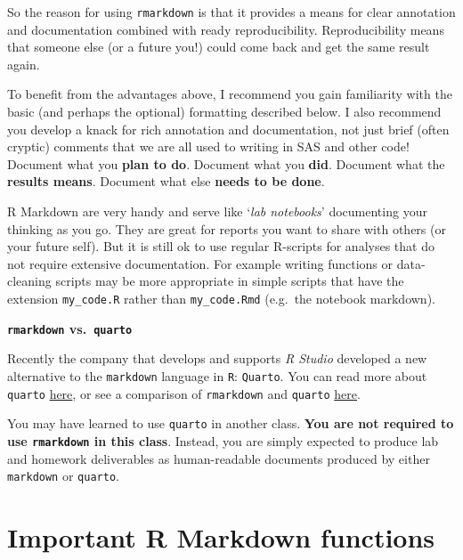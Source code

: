 \documentclass[
]{book}
\newenvironment{rmdtip}[1]
  {
  \begin{itemize}
  \renewcommand{\labelitemi}{
    \raisebox{-.7\height}[0pt][0pt]{
      {\setkeys{Gin}{width=3em,keepaspectratio}\texttt{[image: images/\#1]}}
    }
  }
  \setlength{\fboxsep}{1em}
  \begin{tip}
  \item
  }
  {
  \end{tip}
  \end{itemize}
  }
\begin{document}
So the reason for using \texttt{rmarkdown} is that it provides a means for clear annotation and documentation combined with ready reproducibility. Reproducibility means that someone else (or a future you!) could come back and get the same result again.

To benefit from the advantages above, I recommend you gain familiarity with the basic (and perhaps the optional) formatting described below. I also recommend you develop a knack for rich annotation and documentation, not just brief (often cryptic) comments that we are all used to writing in SAS and other code! Document what you \textbf{plan to do}. Document what you \textbf{did}. Document what the \textbf{results means}. Document what else \textbf{needs to be done}.

\begin{rmdtip}{tip}
R Markdown are very handy and serve like `\emph{lab notebooks}' documenting your thinking as you go. They are great for reports you want to share with others (or your future self). But it is still ok to use regular R-scripts for analyses that do not require extensive documentation. For example writing functions or data-cleaning scripts may be more appropriate in simple scripts that have the extension \texttt{my\_code.R} rather than \texttt{my\_code.Rmd} (e.g.~the notebook markdown).

\end{rmdtip}

\begin{rmdtip}{note}
\textbf{\texttt{rmarkdown} vs.~\texttt{quarto}}

Recently the company that develops and supports \emph{R Studio} developed a new alternative to the \texttt{markdown} language in \texttt{R}: \texttt{Quarto}. You can read more about \texttt{quarto} \href{https://quarto.org/docs/computations/r.html}{here}, or see a comparison of \texttt{rmarkdown} and \texttt{quarto} \href{https://quarto.org/docs/faq/rmarkdown.html}{here}.

You may have learned to use \texttt{quarto} in another class. \textbf{You are not required to use \texttt{rmarkdown} in this class}. Instead, you are simply expected to produce lab and homework deliverables as human-readable documents produced by either \texttt{markdown} or \texttt{quarto}.

\end{rmdtip}

\hypertarget{important-r-markdown-functions}{%
\section{Important R Markdown functions}\label{important-r-markdown-functions}}
\end{document}
